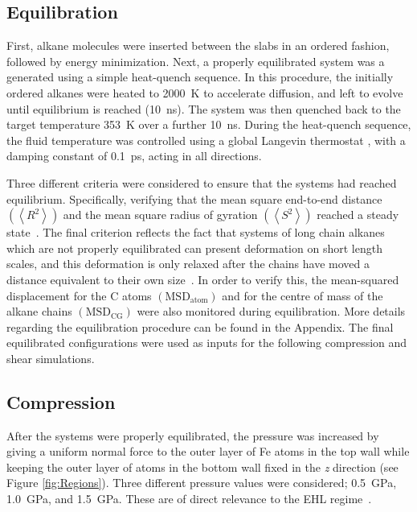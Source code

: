 \documentclass[5p]{elsarticle}
\begin{document}
\subsection{Equilibration}

First, alkane molecules were inserted between the slabs in an ordered fashion, followed by energy minimization. Next, a properly equilibrated system was a generated using a simple heat-quench sequence. In this procedure, the initially ordered alkanes were heated to \SI{2000}{\kelvin} to accelerate diffusion, and left to evolve until equilibrium is reached (\SI{10}{\nano\second}). The system was then quenched back to the target temperature \SI{353}{\kelvin} over a further \SI{10}{\nano\second}. During the heat-quench sequence, the fluid temperature was controlled using a global Langevin thermostat \cite{Schneider1978}, with a damping constant of \SI{0.1}{\pico\second}, acting in all directions.

Three different criteria were considered to ensure that the systems had reached equilibrium. Specifically, verifying that the mean square end-to-end distance $\left(\left< R^2 \right> \right)$ and the mean square radius of gyration $\left(\left< S^2 \right> \right)$ reached a steady state~\cite{Brown1994}. The final criterion reflects the fact that systems of long chain alkanes which are not properly equilibrated can present  deformation  on  short  length  scales,  and  this  deformation is only relaxed after the chains have moved a distance equivalent to their own size~\cite{Auhl2003}. In order to verify this, the mean-squared displacement for the C atoms $\left(\text{MSD}_{\text{atom}}\right)$ and for the centre of mass of the alkane chains $\left(\text{MSD}_{\text{CG}}\right)$ were also monitored during equilibration. More details regarding the equilibration procedure can be found in the Appendix. The final equilibrated configurations were used as inputs for the following compression and shear simulations. 

\subsection{Compression}

After the systems were properly equilibrated, the pressure was increased by giving a uniform normal force to the outer layer of Fe atoms in the top wall while keeping the outer layer of atoms in the bottom wall fixed in the \emph{z} direction (see Figure \ref{fig:Regions}). Three different pressure values were considered; \SI{0.5}{\giga\pascal}, \SI{1.0}{\giga\pascal}, and \SI{1.5}{\giga\pascal}. These are of direct relevance to the EHL regime~\cite{Spikes2014}.
\end{document}
